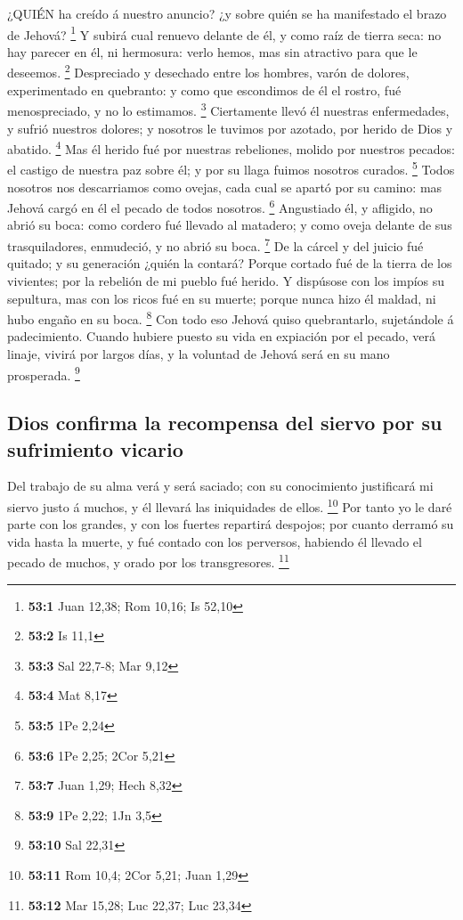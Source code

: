  ¿QUIÉN ha creído á nuestro anuncio? ¿y sobre quién se ha
manifestado el brazo de Jehová? \footnote{\textbf{53:1} Juan 12,38; Rom
  10,16; Is 52,10}  Y subirá cual renuevo delante de él, y
como raíz de tierra seca: no hay parecer en él, ni hermosura: verlo
hemos, mas sin atractivo para que le deseemos. \footnote{\textbf{53:2}
  Is 11,1}  Despreciado y desechado entre los hombres, varón
de dolores, experimentado en quebranto: y como que escondimos de él el
rostro, fué menospreciado, y no lo estimamos. \footnote{\textbf{53:3}
  Sal 22,7-8; Mar 9,12}  Ciertamente llevó él nuestras
enfermedades, y sufrió nuestros dolores; y nosotros le tuvimos por
azotado, por herido de Dios y abatido. \footnote{\textbf{53:4} Mat 8,17}
 Mas él herido fué por nuestras rebeliones, molido por
nuestros pecados: el castigo de nuestra paz sobre él; y por su llaga
fuimos nosotros curados. \footnote{\textbf{53:5} 1Pe 2,24} 
Todos nosotros nos descarriamos como ovejas, cada cual se apartó por su
camino: mas Jehová cargó en él el pecado de todos nosotros. \footnote{\textbf{53:6}
  1Pe 2,25; 2Cor 5,21}  Angustiado él, y afligido, no abrió
su boca: como cordero fué llevado al matadero; y como oveja delante de
sus trasquiladores, enmudeció, y no abrió su boca. \footnote{\textbf{53:7}
  Juan 1,29; Hech 8,32}  De la cárcel y del juicio fué
quitado; y su generación ¿quién la contará? Porque cortado fué de la
tierra de los vivientes; por la rebelión de mi pueblo fué herido.
 Y dispúsose con los impíos su sepultura, mas con los ricos
fué en su muerte; porque nunca hizo él maldad, ni hubo engaño en su
boca. \footnote{\textbf{53:9} 1Pe 2,22; 1Jn 3,5}  Con todo
eso Jehová quiso quebrantarlo, sujetándole á padecimiento. Cuando
hubiere puesto su vida en expiación por el pecado, verá linaje, vivirá
por largos días, y la voluntad de Jehová será en su mano prosperada.
\footnote{\textbf{53:10} Sal 22,31}

\hypertarget{dios-confirma-la-recompensa-del-siervo-por-su-sufrimiento-vicario}{%
\subsection{Dios confirma la recompensa del siervo por su sufrimiento
vicario}\label{dios-confirma-la-recompensa-del-siervo-por-su-sufrimiento-vicario}}

 Del trabajo de su alma verá y será saciado; con su
conocimiento justificará mi siervo justo á muchos, y él llevará las
iniquidades de ellos. \footnote{\textbf{53:11} Rom 10,4; 2Cor 5,21; Juan
  1,29}  Por tanto yo le daré parte con los grandes, y con
los fuertes repartirá despojos; por cuanto derramó su vida hasta la
muerte, y fué contado con los perversos, habiendo él llevado el pecado
de muchos, y orado por los transgresores. \footnote{\textbf{53:12} Mar
  15,28; Luc 22,37; Luc 23,34}

